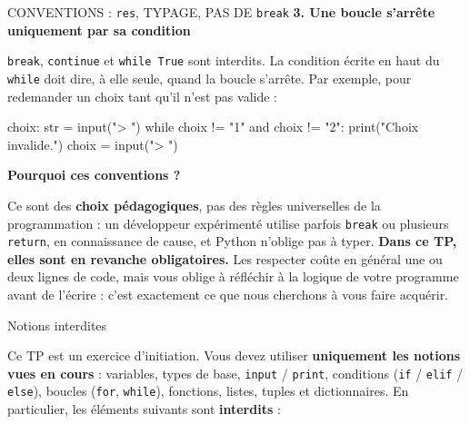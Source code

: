 \documentclass[11pt,a4paper]{article}
\makeatletter
\renewcommand\subsection{\@startsection{subsection}{2}{0pt}{1.2em}{0.5em}%
  {\large\bfseries\color{magenta}}}
\makeatother
\begin{document}
\begin{convention}{CONVENTIONS : \texttt{res}, TYPAGE, PAS DE \texttt{break}}
\medskip
\textbf{\color{magenta}3. Une boucle s'arrête uniquement par sa condition}

\texttt{break}, \texttt{continue} et \texttt{while True} sont interdits. La condition
écrite en haut du \texttt{while} doit dire, à elle seule, quand la boucle s'arrête.
Par exemple, pour redemander un choix tant qu'il n'est pas valide :

\begin{code}
choix: str = input("> ")
while choix != "1" and choix != "2":
    print("Choix invalide.")
    choix = input("> ")
\end{code}

\medskip
\textbf{\color{magenta}Pourquoi ces conventions ?}

Ce sont des \textbf{choix pédagogiques}, pas des règles universelles de la
programmation : un développeur expérimenté utilise parfois \texttt{break} ou plusieurs
\texttt{return}, en connaissance de cause, et Python n'oblige pas à typer. \textbf{Dans ce TP, elles sont en revanche
obligatoires.} Les respecter coûte en général une ou deux lignes de code, mais vous
oblige à réfléchir à la logique de votre programme avant de l'écrire : c'est exactement
ce que nous cherchons à vous faire acquérir.
\end{convention}

\newpage
\subsection{Notions interdites}

Ce TP est un exercice d'initiation. Vous devez utiliser \textbf{uniquement les notions vues
en cours} : variables, types de base, \texttt{input} / \texttt{print}, conditions
(\texttt{if} / \texttt{elif} / \texttt{else}), boucles (\texttt{for}, \texttt{while}),
fonctions, listes, tuples et dictionnaires. En particulier, les éléments suivants sont
\textbf{interdits} :
\end{document}
